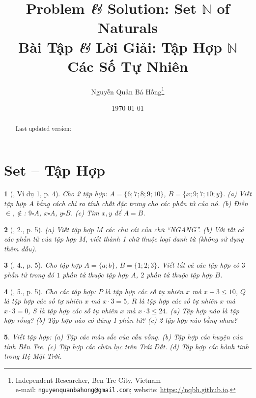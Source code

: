 \documentclass{article}
\title{Problem {\it\&} Solution: Set $\mathbb{N}$ of Naturals\\Bài Tập {\it\&} Lời Giải: Tập Hợp $\mathbb{N}$ Các Số Tự Nhiên}
\author{Nguyễn Quản Bá Hồng\footnote{Independent Researcher, Ben Tre City, Vietnam\\e-mail: \texttt{nguyenquanbahong@gmail.com}; website: \url{https://nqbh.github.io}.}}
\date{\today}
\newtheorem{baitoan}{}
\begin{document}
\maketitle
\begin{abstract}
	Last updated version: 
\end{abstract}


\section{Set -- Tập Hợp}

\begin{baitoan}[\cite{Tuyen_Toan_6}, Ví dụ 1, p. 4]
	Cho 2 tập hợp: $A = \{6;7;8;9;10\}$, $B = \{x;9;7;10;y\}$. (a) Viết tập hợp $A$ bằng cách chỉ ra tính chất đặc trưng cho các phần tử của nó. (b) Điền $\in,\notin$: $9\square A$, $x\square A$, $y\square B$. (c) Tìm $x,y$ để $A = B$.
\end{baitoan}

\begin{baitoan}[\cite{Tuyen_Toan_6}, 2., p. 5]
	(a) Viết tập hợp $M$ các chữ cái của chữ ``NGANG''. (b) Với tất cả các phần tử của tập hợp $M$, viết thành 1 chữ thuộc loại danh từ (không sử dụng thêm dấu).
\end{baitoan}

\begin{baitoan}[\cite{Tuyen_Toan_6}, 4., p. 5]
	Cho tập hợp $A = \{a;b\}$, $B = \{1;2;3\}$. Viết tất cả các tập hợp có $3$ phần tử trong đó $1$ phần tử thuộc tập hợp $A$, $2$ phần tử thuộc tập hợp $B$.
\end{baitoan}

\begin{baitoan}[\cite{Tuyen_Toan_6}, 5., p. 5]
	Cho các tập hợp: $P$ là tập hợp các số tự nhiên $x$ mà $x + 3\le10$, $Q$ là tập hợp các số tự nhiên $x$ mà $x\cdot3 = 5$, $R$ là tập hợp các số tự nhiên $x$ mà $x\cdot3 = 0$, $S$ là tập hợp các số tự nhiên $x$ mà $x\cdot3\le24$. (a) Tập hợp nào là tập hợp rỗng? (b) Tập hợp nào có đúng 1 phần tử? (c) 2 tập hợp nào bằng nhau?
\end{baitoan}

\begin{baitoan}
	Viết tập hợp: (a) Tập các màu sắc của cầu vồng. (b) Tập hợp các huyện của tỉnh Bến Tre. (c) Tập hợp các châu lục trên Trái Đất. (d) Tập hợp các hành tinh trong Hệ Mặt Trời.
\end{baitoan}
\end{document}
